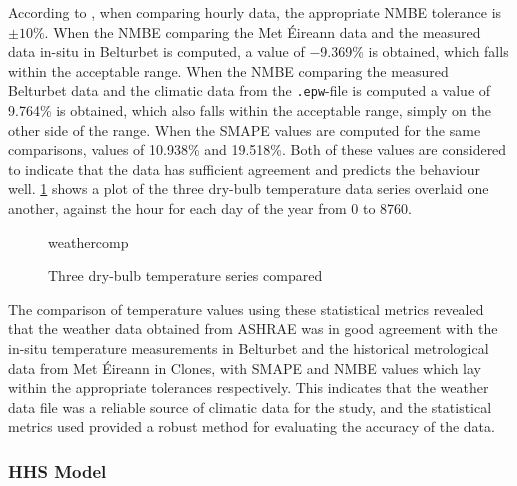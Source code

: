 According to  \cite{ashrae_guideline_project_committee_14_ashrae_2014}, when comparing hourly data, the appropriate \ac{NMBE} tolerance is $\pm10\%$. When the \ac{NMBE} comparing the Met Éireann data and the measured data  in-situ in Belturbet is computed, a value of \num{-9.369}\% is obtained, which falls within the acceptable range. When the \ac{NMBE} comparing the measured Belturbet data and the climatic data from the \texttt{.epw}-file is computed a value of \num{9.764}\% is obtained, which also falls within the acceptable range, simply on the other side of the range. When the \ac{SMAPE} values are computed for the same comparisons, values of \num{10.938}\% and \num{19.518}\%. Both of these values are considered to indicate that the data has sufficient agreement and predicts the behaviour well. \cref{fig:weathercomp} shows a plot of the three dry-bulb temperature data series overlaid one another, against the hour for each day of the year from 0 to 8760. 

\begin{figure}[htb]
    \centering
    {weathercomp}
    \caption{Three dry-bulb temperature series compared}
    \label{fig:weathercomp}
\end{figure}


The comparison of temperature values using these statistical metrics revealed that the weather data obtained from ASHRAE was in good agreement with the in-situ temperature measurements in Belturbet and the historical metrological data from Met Éireann in Clones, with \ac{SMAPE} and \ac{NMBE} values which lay within the appropriate tolerances respectively. This indicates that the weather data file was a reliable source of climatic data for the study, and the statistical metrics used provided a robust method for evaluating the accuracy of the data. 

\subsubsection{HHS Model}

